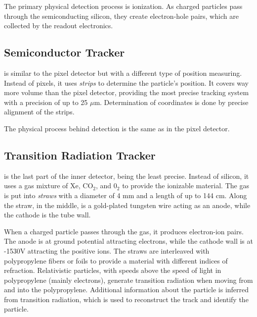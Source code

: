 The primary physical detection process is ionization.
As charged particles pass through the semiconducting silicon, they create electron-hole pairs, which are collected by the readout electronics.

\subsection{Semiconductor Tracker}
\SCT is similar to the pixel detector but with a different type of position measuring.
Instead of pixels, it uses  \emph{strips} to determine the particle's position.
It covers way more volume than the pixel detector, providing the most precise tracking system with a precision of up to 25 $\mu$m.
Determination of coordinates is done by precise alignment of the strips.

The physical process behind detection is the same as in the pixel detector.

\subsection{Transition Radiation Tracker}
\TRT is the last part of the inner detector, being the least precise.
Instead of silicon, it uses a gas mixture of Xe, CO$_2$, and 0$_2$ to provide the ionizable material.
The gas is put into \emph{straws} with a diameter of 4 mm and a length of up to 144 cm.
Along the straw, in the middle, is a gold-plated tungsten wire acting as an anode, while the cathode is the tube wall.

When a charged particle passes through the gas, it produces electron-ion pairs.
The anode is at ground potential attracting electrons, while the cathode wall is at -1530V attracting the positive ions.
The straws are interleaved with polypropylene fibers or foils to provide a material with different indices of refraction.
Relativistic particles, with speeds above the speed of light in polypropylene (mainly electrons), generate transition radiation when moving from and into the polypropylene. 
Additional information about the particle is inferred from transition radiation, which is used to reconstruct the track and identify the particle. 



